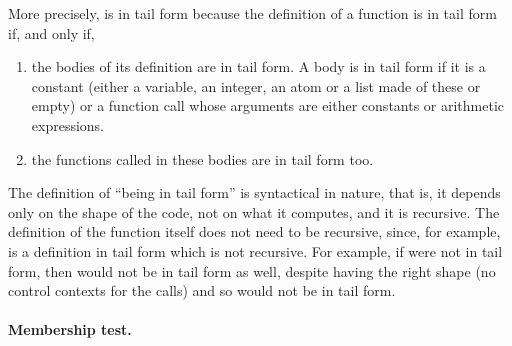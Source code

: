 More precisely,  is in tail form because
the definition of a function is in tail form if, and only if,
\begin{enumerate}

  \item the bodies of its definition are in tail form. A body is in
    tail form if it is a constant (either a variable, an integer, an
    atom or a list made of these or empty) or a function call whose
    arguments are either constants or arithmetic expressions.

  \item the functions called in these bodies are in tail form too.

\end{enumerate}
The definition of ``being in tail form'' is syntactical in nature, that is,
it depends only on the shape of the code, not on what it computes, and
it is recursive. The definition of the function itself does not need
to be recursive, since, for example,   is a
definition in tail form which is not recursive. For example, if
 were not in tail form, then  would
not be in tail form as well, despite having the right shape (no
control contexts for the calls) and so would not
 be in tail form.

\medskip

\paragraph{Membership test.}

